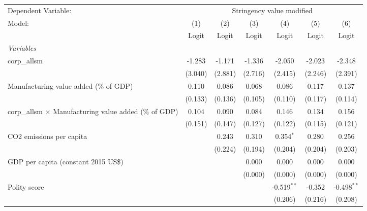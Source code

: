 
\begingroup
\centering
\begin{tabular}{lcccccc}
   \toprule
   Dependent Variable: & \multicolumn{6}{c}{Stringency value modified}\\
   Model:                                                        & (1)     & (2)     & (3)     & (4)           & (5)     & (6)\\  
                                                                 &  Logit  & Logit   & Logit   & Logit         & Logit   & Logit\\  
   \midrule
   \emph{Variables}\\
   corp\_allsm                                                   & -1.283  & -1.171  & -1.336  & -2.050        & -2.023  & -2.348\\   
                                                                 & (3.040) & (2.881) & (2.716) & (2.415)       & (2.246) & (2.391)\\   
   Manufacturing value added (\% of GDP)                         & 0.110   & 0.086   & 0.068   & 0.086         & 0.117   & 0.137\\   
                                                                 & (0.133) & (0.136) & (0.105) & (0.110)       & (0.117) & (0.114)\\   
   corp\_allsm $\times$ Manufacturing value added (\% of GDP)    & 0.104   & 0.090   & 0.084   & 0.146         & 0.134   & 0.156\\   
                                                                 & (0.151) & (0.147) & (0.127) & (0.122)       & (0.115) & (0.121)\\   
   CO2 emissions per capita                                      &         & 0.243   & 0.310   & 0.354$^{*}$   & 0.280   & 0.256\\   
                                                                 &         & (0.224) & (0.194) & (0.204)       & (0.204) & (0.203)\\   
   GDP per capita (constant 2015 US\$)                           &         &         & 0.000   & 0.000         & 0.000   & 0.000\\   
                                                                 &         &         & (0.000) & (0.000)       & (0.000) & (0.000)\\   
   Polity score                                                  &         &         &         & -0.519$^{**}$ & -0.352  & -0.498$^{**}$\\   
                                                                 &         &         &         & (0.206)       & (0.216) & (0.208)\\   

\end{tabular}
